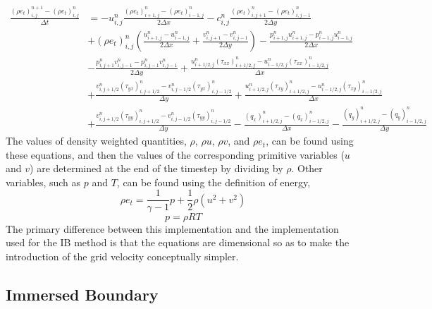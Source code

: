\documentclass{article}
\begin{document}
\begin{equation}
  \begin{aligned}
    \frac{(\rho e_t)^{n+1}_{i,j} - (\rho e_t)^{n}_{i,j}}{\Delta t} &= - u^{n}_{i,j} \frac{(\rho e_t)^{n}_{i+1,j}-(\rho e_t)^{n}_{i-1,j}}{2\Delta x} - c^{n}_{i,j}\frac{(\rho e_t)^{n}_{i,j+1}-(\rho e_t)^{n}_{i,j-1}}{2\Delta y} \\
    &+ (\rho e_t)^{n}_{i,j} \left(\frac{u^{n}_{i+1,j}-u^{n}_{i-1,j}}{2\Delta x} + \frac{v^{n}_{i,j+1}-v^{n}_{i,j-1}}{2\Delta y}\right) - \frac{p^{n}_{i+1,j}u^{n}_{i+1,j} - p^{n}_{i-1,j} u^{n}_{i-1,j}}{2\Delta x} \\
    &- \frac{p^{n}_{i,j+1} v^{n}_{i,j-1} - p^{n}_{i,j-1} v^{n}_{i,j-1}}{2\Delta y} + \frac{u^{n}_{i+1/2,j}(\tau_{xx})^{n}_{i+1/2,j} - u^{n}_{i-1/2,j} (\tau_{xx})^{n}_{i-1/2,j}}{\Delta x} \\
    &+ \frac{v^{n}_{i,j+1/2} (\tau_{yx})^{n}_{i,j+1/2} - v^{n}_{i,j-1/2} (\tau_{yx})^{n}_{i,j-1/2}}{\Delta y} + \frac{u^{n}_{i+1/2,j} (\tau_{xy})^{n}_{i+1/2,j} - u^{n}_{i-1/2,j}(\tau_{xy})^{n}_{i-1/2,j}}{\Delta x}  \\
    &+ \frac{v^{n}_{i,j+1/2} (\tau_{yy})^{n}_{i,j+1/2} - v^{n}_{i,j-1/2} (\tau_{yy})^{n}_{i,j-1/2}}{\Delta y} - \frac{(q_x)^{n}_{i+1/2,j} - (q_x)^{n}_{i-1/2,j}}{\Delta x} - \frac{(q_y)^{n}_{i+1/2,j} - (q_y)^{n}_{i-1/2,j}}{\Delta y}
  \end{aligned}
\end{equation}
The values of density weighted quantities, $\rho$, $\rho u$, $\rho v$, and $\rho e_t$, can be found using these equations, and then the values of the corresponding primitive variables ($u$ and $v$) are determined at the end of the timestep by dividing by $\rho$.  Other variables, such as $p$ and $T$, can be found using the definition of energy,
\begin{equation}
  \rho e_t = \frac{1}{\gamma -1} p + \frac{1}{2} \rho (u^2 + v^2)
\end{equation}
\begin{equation}
  p = \rho R T
\end{equation}
The primary difference between this implementation and the implementation used for the IB method is that the equations are dimensional so as to make the introduction of the grid velocity conceptually simpler.

\subsection{Immersed Boundary}
\end{document}

